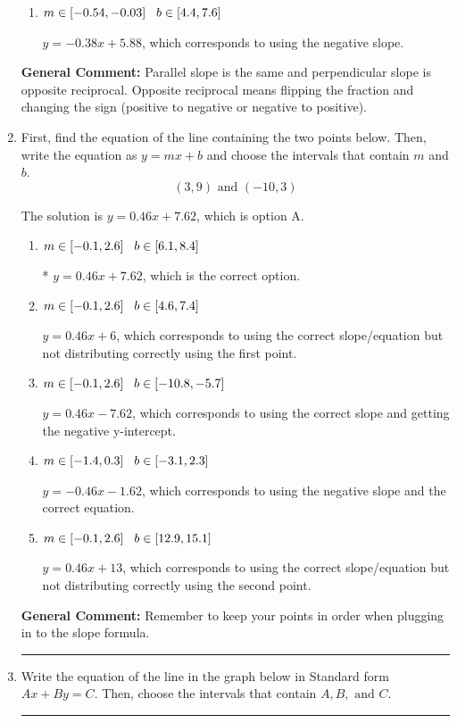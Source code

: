 \documentclass{extbook}[14pt]
\newcommand{\litem}[1]{\item #1

\rule{\textwidth}{0.4pt}}
\begin{document}
\begin{enumerate}
{\begin{enumerate}[label=\Alph*.]
 $y = 0.38x - 2.12$, which corresponds to using the correct slope and getting the negative $y$-intercept.
\item \( m \in [-0.54, -0.03] \hspace*{3mm} b \in [4.4, 7.6] \)

 $y = -0.38x + 5.88$, which corresponds to using the negative slope.
\end{enumerate}

\textbf{General Comment:} Parallel slope is the same and perpendicular slope is opposite reciprocal. Opposite reciprocal means flipping the fraction and changing the sign (positive to negative or negative to positive).
}
\litem{
First, find the equation of the line containing the two points below. Then, write the equation as $ y=mx+b $ and choose the intervals that contain $m$ and $b$.
\[ (3, 9) \text{ and } (-10, 3) \]

The solution is \( y = 0.46x + 7.62 \), which is option A.\begin{enumerate}[label=\Alph*.]
\item \( m \in [-0.1, 2.6] \hspace*{3mm} b \in [6.1, 8.4] \)

* $y = 0.46x + 7.62$, which is the correct option.
\item \( m \in [-0.1, 2.6] \hspace*{3mm} b \in [4.6, 7.4] \)

 $y = 0.46x + 6$, which corresponds to using the correct slope/equation but not distributing correctly using the first point.
\item \( m \in [-0.1, 2.6] \hspace*{3mm} b \in [-10.8, -5.7] \)

 $y = 0.46x -7.62$, which corresponds to using the correct slope and getting the negative y-intercept.
\item \( m \in [-1.4, 0.3] \hspace*{3mm} b \in [-3.1, 2.3] \)

 $y = -0.46x -1.62$, which corresponds to using the negative slope and the correct equation.
\item \( m \in [-0.1, 2.6] \hspace*{3mm} b \in [12.9, 15.1] \)

 $y = 0.46x + 13$, which corresponds to using the correct slope/equation but not distributing correctly using the second point.
\end{enumerate}

\textbf{General Comment:} Remember to keep your points in order when plugging in to the slope formula.
}
\litem{
Write the equation of the line in the graph below in Standard form $Ax+By=C$. Then, choose the intervals that contain $A, B, \text{ and } C$.

}
\end{enumerate}
\end{document}

